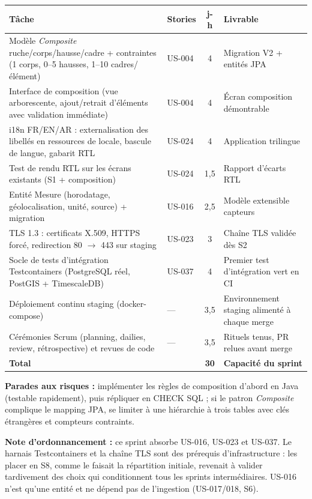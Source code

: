 \begin{center}
\small
\begin{tabular}{p{7.2cm}lcp{4.6cm}}
\toprule
\textbf{Tâche} & \textbf{Stories} & \textbf{j-h} & \textbf{Livrable} \\
\midrule
Modèle \emph{Composite} ruche/corps/hausse/cadre + contraintes
(1 corps, 0--5 hausses, 1--10 cadres/élément) & US-004 & 4 & Migration V2 + entités JPA \\
Interface de composition (vue arborescente, ajout/retrait
d'éléments avec validation immédiate) & US-004 & 4 & Écran composition démontrable \\
i18n FR/EN/AR : externalisation des libellés en ressources de locale, bascule de langue,
gabarit RTL & US-024 & 4 & Application trilingue \\
Test de rendu RTL sur les écrans existants (S1 + composition) & US-024 & 1,5 & Rapport d'écarts RTL \\
Entité Mesure (horodatage, géolocalisation, unité, source) +
migration & US-016 & 2,5 & Modèle extensible capteurs \\
TLS 1.3 : certificats X.509, HTTPS forcé, redirection 80 $\rightarrow$ 443
sur staging & US-023 & 3 & Chaîne TLS validée dès S2 \\
Socle de tests d'intégration Testcontainers (PostgreSQL réel, PostGIS + TimescaleDB) & US-037 & 4 & Premier test d'intégration vert en CI \\
Déploiement continu staging (docker-compose) & --- & 3,5 & Environnement staging alimenté à chaque merge \\
\addlinespace
Cérémonies Scrum (planning, dailies, review, rétrospective) et
revues de code & --- & 3,5 & Rituels tenus, PR relues avant merge \\
\midrule
\textbf{Total} & & \textbf{30} & \textbf{Capacité du sprint} \\
\bottomrule
\end{tabular}
\end{center}

\textbf{Parades aux risques :} implémenter les règles de composition
d'abord en Java (testable rapidement), puis répliquer en CHECK SQL ; si le
patron \emph{Composite} complique le mapping JPA, se limiter à une
hiérarchie à trois tables avec clés étrangères et compteurs contraints.

\textbf{Note d'ordonnancement :} ce sprint absorbe US-016, US-023 et US-037.
Le harnais Testcontainers et la chaîne TLS sont des prérequis d'infrastructure :
les placer en S8, comme le faisait la répartition initiale, revenait à
valider tardivement des choix qui conditionnent tous les sprints
intermédiaires. US-016 n'est qu'une entité et ne dépend pas de l'ingestion
(US-017/018, S6).

